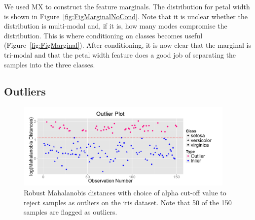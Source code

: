 \documentclass{article}
\begin{document}
We used MX to construct the feature marginals. The distribution for petal width is shown in Figure~\ref{fig:FigMarginalNoCond}. Note that it is unclear whether the distribution is multi-modal and, if it is, how many modes compromise the distribution. This is where conditioning on classes becomes useful (Figure~\ref{fig:FigMarginal}). After conditioning, it is now clear that the marginal is tri-modal and that the petal width feature does a good job of separating the samples into the three classes.

\subsection{Outliers}
\label{subsec:SubSecOutliers}

\begin{figure}[t!]
	\centering
	\includegraphics[width=0.95\textwidth]{Figures/Iris/OutliersIris.png}
	\caption{Robust Mahalanobis distances with choice of alpha cut-off value to reject samples as outliers on the iris dataset. Note that 50 of the 150 samples are flagged as outliers.}
	\label{fig:FigOutliers}
\end{figure}
\end{document}
